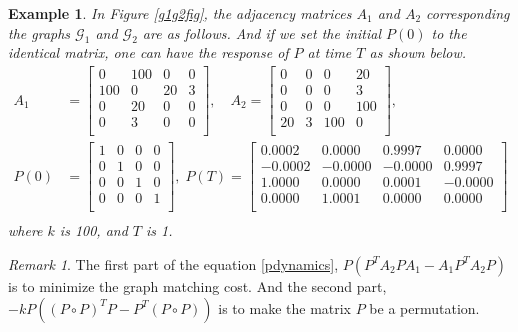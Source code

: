 \documentclass[11pt, a4paper, oneside, openany, reqno]{book}
\newtheorem{example}{Example}
\theoremstyle{definition}
\theoremstyle{remark}
\newtheorem{remark}[theorem]{Remark}
\numberwithin{equation}{chapter} %
\newcommand{\GRP}{\mathcal{G}}
\begin{document}
\begin{example}
	In Figure \ref{g1g2fig}, 
	the adjacency matrices $ A_1 $ and $ A_2 $ corresponding the graphs $ \GRP_1 $ and $ \GRP_2 $ 
	are	as follows.	And if we set the initial $ P(0) $ to the identical matrix, 
	one can have the response of $ P $ at time $ T $ as shown below.
	\begin{equation}\begin{split}
		A_1 &=\left[\begin{array}{cccc } 
			0 & 100 & 0 & 0 \\ 100 & 0 & 20 & 3 \\ 0 & 20 & 0 & 0 \\ 0 & 3 & 0 & 0 \\  \end{array}  \right],
		\quad A_2= \left[\begin{array}{cccc}
			0 & 0 & 0 & 20 \\ 0 & 0 & 0 & 3 \\ 0 & 0 & 0 & 100 \\ 20 & 3 & 100 & 0 \\  \end{array}  \right],\\
		P(0) &= \left[\begin{array}{cccc } 
			1 & 0 & 0 & 0 \\ 0 & 1 & 0 & 0\\ 0 & 0 & 1 & 0 \\ 0 & 0 & 0 & 1 \\ \end{array}  \right],
		\; P(T) = \left[\begin{array}{cccc } 
		    0.0002 &   0.0000 &   0.9997  &  0.0000\\
		   -0.0002 &  -0.0000 &  -0.0000  &  0.9997\\
		    1.0000 &   0.0000 &   0.0001  & -0.0000\\
		    0.0000 &   1.0001 &   0.0000  &  0.0000\\
		\end{array}  \right]\\		
	\end{split}\end{equation}
	where $ k $ is 100, and $ T $ is 1.
\end{example}

\begin{remark}
	The first part of the equation \eqref{pdynamics}, 
	$ P \left( P^T A_2 P A_1 - A_1 P^T A_2 P \right) $ is to minimize the graph matching cost.
	And the second part, $ -k P \left( (P \circ P)^T P -P^T (P \circ P) \right) $
	is to make the matrix $ P $ be a permutation.
\end{remark}
\end{document}
